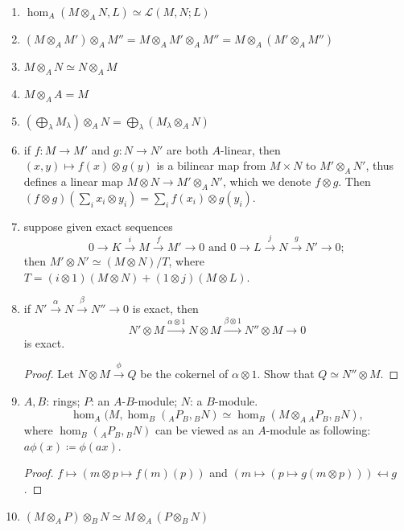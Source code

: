 \begin{enumerate}
  \item \( \hom_A(M \otimes_A N, L) \simeq \mathscr{L}(M, N; L) \)
  \item \( (M \otimes_A M') \otimes_A M'' = M \otimes_A M' \otimes_A M'' = M \otimes_A (M' \otimes_A M'') \)
  \item \( M \otimes_A N \simeq N \otimes_A M \)
  \item \( M \otimes_A A = M \)
  \item \( (\bigoplus_\lambda M_\lambda) \otimes_A N = \bigoplus_\lambda(M_\lambda \otimes_A N) \)
  \item if \( f: M \to M' \) and \( g: N \to N' \) are both \( A \)-linear, then \( (x, y) \mapsto f(x) \otimes g(y) \) is a bilinear map from \( M \times N \) to \( M' \otimes_A N' \), thus defines a linear map \( M \otimes N \to M' \otimes_A N' \), which we denote \( f \otimes g \).
    Then \( (f \otimes g)(\sum_i x_i \otimes y_i) = \sum_i f(x_i) \otimes g(y_i) \).
  \item suppose given exact sequences
    \[
      0 \to K \xrightarrow{i} M  \xrightarrow{f} M' \to 0 \text{ and }
      0 \to L \xrightarrow{j} N  \xrightarrow{g} N' \to 0;
    \]
    then \( M' \otimes N' \simeq (M \otimes N) / T \), where \( T = (i \otimes 1)(M \otimes N) + (1 \otimes j)(M \otimes L) \).
  \item if \( N' \xrightarrow{\alpha} N \xrightarrow{\beta} N'' \to 0 \) is exact, then
    \[
       N' \otimes M \xrightarrow{\alpha \otimes 1} N \otimes M \xrightarrow{\beta \otimes 1} N'' \otimes M \to 0
    \]
    is exact.
    \begin{proof}
      Let \( N \otimes M \xrightarrow{\phi} Q \) be the cokernel of \( \alpha \otimes 1 \).
      Show that \( Q \simeq N'' \otimes M \).
    \end{proof}
  \item \( A, B \): rings; \( P \): an \( A \)-\( B \)-module; \( N \): a \( B \)-module.
    \[
      \hom_A(M, \hom_B({}_AP_B, {}_BN) \simeq \hom_B(M \otimes_A {}_AP_B, {}_BN),
    \]
    where \( \hom_B({}_AP_B, {}_BN) \) can be viewed as an \( A \)-module as following: \( a\phi(x) \coloneq \phi(ax) \).
    \begin{proof}
      \( f \mapsto \left(m \otimes p \mapsto f(m)(p) \right) \) and
      \( \left(m \mapsto (p \mapsto g(m \otimes p))\right) \mapsfrom g \).
    \end{proof}
  \item \( (M \otimes_A P) \otimes_B N \simeq M \otimes_A (P \otimes_B N) \)
\end{enumerate}


